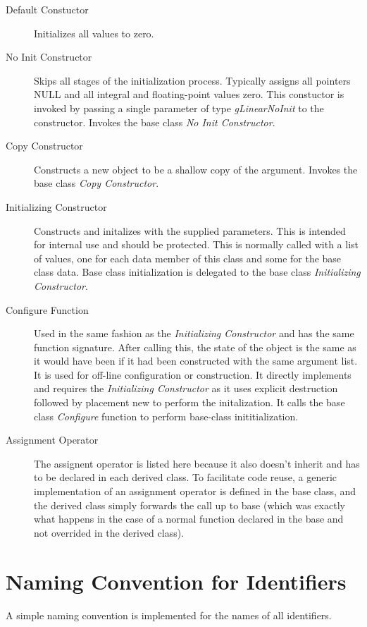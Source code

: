 \documentclass[12pt,a4paper]{book}
\begin{document}
\begin{description}
  \item [Default Constuctor] 
    Initializes all values to zero.
  \item [No Init Constructor] 
    Skips all stages of the initialization process. Typically assigns all
    pointers NULL and all  integral and floating-point values zero. This
    constuctor is invoked by passing a single parameter of type
    \emph{gLinearNoInit} to the constructor. Invokes the base class
    \emph{No Init Constructor}.
  \item [Copy Constructor]
    Constructs a new object to be a shallow copy of the argument. Invokes
    the base class \emph{Copy Constructor}.
  \item [Initializing Constructor]
    Constructs and initalizes with the supplied parameters. This is intended for
    internal use and should be protected. This is normally called with a
    list of values, one for each data member of this class and some for
    the base class data. Base class initialization is delegated to the
    base class \emph{Initializing Constructor}.
  \item [Configure Function]
    Used in the same fashion as the \emph{Initializing Constructor} and
    has the same function signature. After calling this, the state of the
    object is the same as it would have been if it had been constructed
    with the same argument list. It is used for off-line configuration or
    construction. It directly implements and requires the
    \emph{Initializing Constructor} as it uses explicit destruction
    followed by placement new to perform the initalization. It calls the
    base class \emph{Configure} function to perform base-class
    inititialization.
  \item [Assignment Operator]
    The assignent operator is listed here because it also doesn't inherit
    and has to be declared in each derived class. To facilitate code
    reuse, a generic implementation of an assignment operator is defined in the
    base class, and the derived class simply forwards the call up to base (which
    was exactly what happens in the case of a normal function declared in the
    base and not overrided in the derived class).
\end{description}

\section{Naming Convention for Identifiers}
A simple naming convention is implemented for the names of all identifiers.
\end{document}
